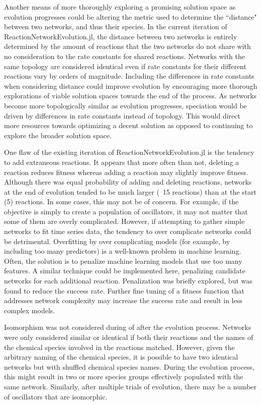 \documentclass[12pt]{report}
\begin{document}
Another means of more thoroughly exploring a promising solution space as evolution progresses could be altering the metric used to determine the ``distance" between two networks, and thus their species. In the current iteration of ReactionNetworkEvolution.jl, the distance between two networks is entirely determined by the amount of reactions that the two networks do not share with no consideration to the rate constants for shared reactions. Networks with the same topology are considered identical even if rate constants for their different reactions vary by orders of magnitude. Including the differences in rate constants when considering distance could improve evolution by encouraging more thorough explorations of viable solution spaces towards the end of the process. As networks become more topologically similar as evolution progresses, speciation would be driven by differences in rate constants instead of topology. This would direct more resources towards optimizing a decent solution as opposed to continuing to explore the broader solution space.

One flaw of the existing iteration of ReactionNetworkEvolution.jl is the tendency to add extraneous reactions. It appears that more often than not, deleting a reaction reduces fitness whereas adding a reaction may slightly improve fitness. Although there was equal probability of adding and deleting reactions, networks at the end of evolution tended to be much larger (~15 reactions) than at the start (5) reactions. In some cases, this may not be of concern. For example, if the objective is simply to create a population of oscillators, it may not matter that some of them are overly complicated. However, if attempting to gather simple networks to fit time series data, the tendency to over complicate networks could be detrimental. Overfitting by over complicating models (for example, by including too many predictors) is a well-known problem in machine learning. Often, the solution is to penalize machine learning models that use too many features. A similar technique could be implemented here, penalizing candidate networks for each additional reaction. Penalization was briefly explored, but was found to reduce the success rate. Further fine tuning of a fitness function that addresses network complexity may increase the success rate and result in less complex models.

Isomorphism was not considered during of after the evolution process. Networks were only considered similar or identical if both their reactions and the names of the chemical species involved in the reactions matched. However, given the arbitrary naming of the chemical species, it is possible to have two identical networks but with shuffled chemical species names. During the evolution process, this might result in two or more species groups effectively populated with the same network. Similarly, after multiple trials of evolution, there may be a number of oscillators that are isomorphic. 
\end{document}
